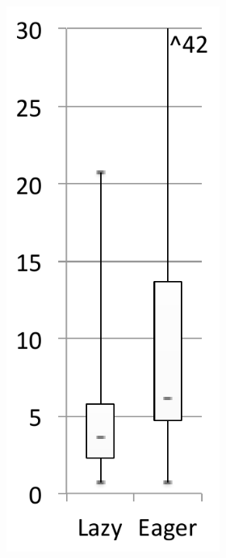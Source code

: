 \documentclass[sigplan,10pt,review,anonymous]{acmart}\settopmatter{printfolios=true,printccs=false,printacmref=false}
\begin{document}
\begin{figure}[bth]
	\centering
	\begin{subfigure}[b]{.48\textwidth}
    	\begin{subfigure}[b]{.24\textwidth}
		\includegraphics[width=\linewidth]{figures/netBeansLoad} 

\end{subfigure}
\end{subfigure}
\end{figure}
\end{document}
